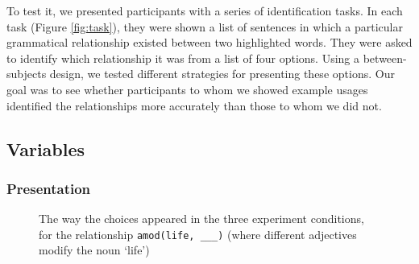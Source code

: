 \documentclass{sigchi}
\newcommand{\code}[1] {\texttt{#1}}
\begin{document}
To test it, we presented participants with a series of identification tasks. In each task (Figure \ref{fig:task}), they were shown a list of sentences in which a particular grammatical relationship existed between two highlighted words. They were asked to identify which relationship it was from a list of four options.  Using a between-subjects design, we tested different strategies for presenting these options. Our goal was to see whether participants to whom we showed example usages identified the relationships more accurately than those to whom we did not.

\subsection{Variables}

\subsubsection{Presentation}

\begin{figure}
\caption{\label{fig:choices} The way the choices appeared in the three experiment conditions, for the relationship \code{amod(life, \_\_\_)} (where different adjectives modify the noun `life')}
\end{figure}
\end{document}
